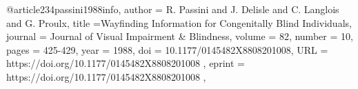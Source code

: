 @article{234passini1988info,
author = {R. Passini and J. Delisle and C. Langlois and G. Proulx},
title ={Wayfinding Information for Congenitally Blind Individuals},
journal = {Journal of Visual Impairment \& Blindness},
volume = {82},
number = {10},
pages = {425-429},
year = {1988},
doi = {10.1177/0145482X8808201008},
URL = { https://doi.org/10.1177/0145482X8808201008 },
eprint = { https://doi.org/10.1177/0145482X8808201008 },
}